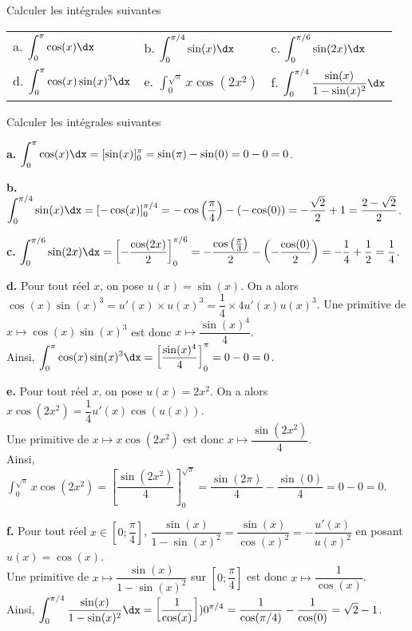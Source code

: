 \documentclass[11pt,fleqn, openany]{book} %
\begin{document}
\begin{exercise}Calculer les intégrales suivantes

\begin{tabularx}{\linewidth}{XXX}
a. $\displaystyle\int_0^{\pi} \cos(x)\dx$ & b. $\displaystyle\int_0^{\pi /4} \sin(x)\dx$ & c. $\displaystyle\int_0^{\pi / 6} \sin(2x)\dx$ \\
d. $\displaystyle\int_0^{\pi} \cos(x)\sin(x)^3\dx$ & e. $\displaystyle\int_0^{\sqrt{\pi}}x\cos(2x^2)$ & f. $\displaystyle\int_0^{\pi/4} \dfrac{\sin(x)}{1-\sin(x)^2}\dx$
\end{tabularx}

\end{exercise}


\begin{solution}Calculer les intégrales suivantes

\textbf{a.} $\displaystyle\int_0^{\pi} \cos(x)\dx = [\sin(x)]_0^{\pi}=\sin(\pi)-\sin(0)=0-0=0$.

\textbf{b.} $\displaystyle\int_0^{\pi /4} \sin(x)\dx = [-\cos(x)]_0^{\pi /4}=-\cos\left(\dfrac{\pi}{4}\right)-(-\cos(0))=-\dfrac{\sqrt{2}}{2}+1=\dfrac{2-\sqrt{2}}{2}$.

\textbf{c.} $\displaystyle\int_0^{\pi / 6} \sin(2x)\dx = \left[-\dfrac{\cos(2x)}{2}\right]_0^{\pi/6} = -\dfrac{\cos\left(\frac{\pi}{3}\right)}{2}-\left(-\dfrac{\cos(0)}{2}\right)=-\dfrac{1}{4}+\dfrac{1}{2}=\dfrac{1}{4}$.

\textbf{d.} Pour tout réel $x$, on pose $u(x)=\sin(x)$. On a alors $\cos(x)\sin(x)^3 = u'(x) \times u(x)^3 = \dfrac{1}{4} \times 4u'(x)u(x)^3$. Une primitive de $x\mapsto \cos(x)\sin(x)^3$ est donc $x\mapsto \dfrac{\sin(x)^4}{4}$. \\ Ainsi, $\displaystyle\int_0^{\pi} \cos(x)\sin(x)^3\dx = \left[\dfrac{\sin(x)^4}{4}\right]_0^{\pi}=0-0=0$.

\textbf{e.} Pour tout réel $x$, on pose $u(x)=2x^2$. On a alors $x\cos(2x^2) = \dfrac{1}{4}u'(x)\cos(u(x))$. \\Une primitive de $x\mapsto x\cos(2x^2)$ est donc $x\mapsto \dfrac{\sin(2x^2)}{4}$. \\ Ainsi, $\displaystyle\int_0^{\sqrt{\pi}}x\cos(2x^2) = \left[\dfrac{\sin(2x^2)}{4}\right]_0^{\sqrt{\pi}}= \dfrac{\sin(2\pi)}{4}-\dfrac{\sin(0)}{4}=0-0=0$.

\textbf{f.} Pour tout réel $x\in \left[0;\dfrac{\pi}{4}\right]$, $\dfrac{\sin(x)}{1-\sin(x)^2}=\dfrac{\sin(x)}{\cos(x)^2} = -\dfrac{u'(x)}{u(x)^2}$ en posant $u(x)=\cos(x)$. \\ Une primitive de $x\mapsto \dfrac{\sin(x)}{1-\sin(x)^2}$ sur $\left[0;\dfrac{\pi}{4}\right]$ est donc $x\mapsto \dfrac{1}{\cos(x)}$.\\ Ainsi, $\displaystyle\int_0^{\pi/4} \dfrac{\sin(x)}{1-\sin(x)^2}\dx=\left[\dfrac{1}{\cos(x)}\right])0^{\pi/4}=\dfrac{1}{\cos(\pi/4)}-\dfrac{1}{\cos(0)}=\sqrt{2}-1$.

\end{solution}
\end{document}

